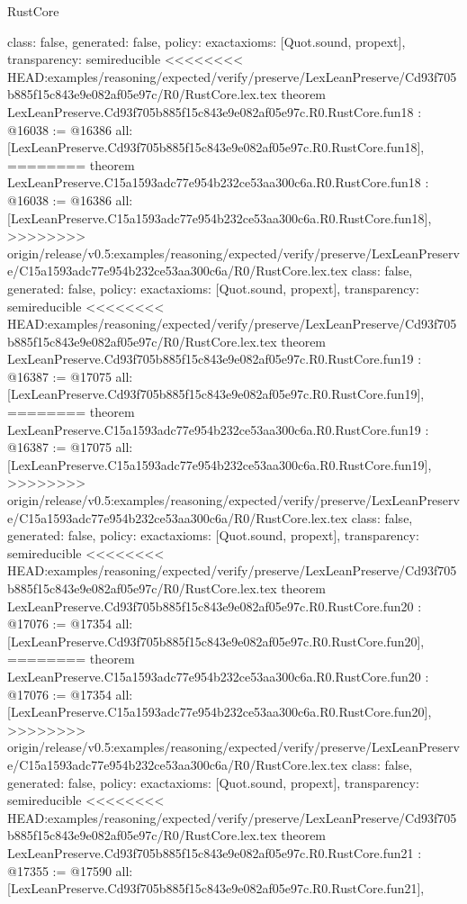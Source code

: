 \begin{lexlean}{RustCore}
\begin{coremodule}
{\begin{coremodule}
{{{{{{{{{{{{{{{{{{{{{  class: false,
  generated: false,
  policy: exact{axioms: [Quot.sound, propext]},
  transparency: semireducible
}
<<<<<<<< HEAD:examples/reasoning/expected/verify/preserve/LexLeanPreserve/Cd93f705b885f15c843e9e082af05e97c/R0/RustCore.lex.tex
theorem LexLeanPreserve.Cd93f705b885f15c843e9e082af05e97c.R0.RustCore.fun18 : @16038 := @16386 {
  all: [LexLeanPreserve.Cd93f705b885f15c843e9e082af05e97c.R0.RustCore.fun18],
========
theorem LexLeanPreserve.C15a1593adc77e954b232ce53aa300c6a.R0.RustCore.fun18 : @16038 := @16386 {
  all: [LexLeanPreserve.C15a1593adc77e954b232ce53aa300c6a.R0.RustCore.fun18],
>>>>>>>> origin/release/v0.5:examples/reasoning/expected/verify/preserve/LexLeanPreserve/C15a1593adc77e954b232ce53aa300c6a/R0/RustCore.lex.tex
  class: false,
  generated: false,
  policy: exact{axioms: [Quot.sound, propext]},
  transparency: semireducible
}
<<<<<<<< HEAD:examples/reasoning/expected/verify/preserve/LexLeanPreserve/Cd93f705b885f15c843e9e082af05e97c/R0/RustCore.lex.tex
theorem LexLeanPreserve.Cd93f705b885f15c843e9e082af05e97c.R0.RustCore.fun19 : @16387 := @17075 {
  all: [LexLeanPreserve.Cd93f705b885f15c843e9e082af05e97c.R0.RustCore.fun19],
========
theorem LexLeanPreserve.C15a1593adc77e954b232ce53aa300c6a.R0.RustCore.fun19 : @16387 := @17075 {
  all: [LexLeanPreserve.C15a1593adc77e954b232ce53aa300c6a.R0.RustCore.fun19],
>>>>>>>> origin/release/v0.5:examples/reasoning/expected/verify/preserve/LexLeanPreserve/C15a1593adc77e954b232ce53aa300c6a/R0/RustCore.lex.tex
  class: false,
  generated: false,
  policy: exact{axioms: [Quot.sound, propext]},
  transparency: semireducible
}
<<<<<<<< HEAD:examples/reasoning/expected/verify/preserve/LexLeanPreserve/Cd93f705b885f15c843e9e082af05e97c/R0/RustCore.lex.tex
theorem LexLeanPreserve.Cd93f705b885f15c843e9e082af05e97c.R0.RustCore.fun20 : @17076 := @17354 {
  all: [LexLeanPreserve.Cd93f705b885f15c843e9e082af05e97c.R0.RustCore.fun20],
========
theorem LexLeanPreserve.C15a1593adc77e954b232ce53aa300c6a.R0.RustCore.fun20 : @17076 := @17354 {
  all: [LexLeanPreserve.C15a1593adc77e954b232ce53aa300c6a.R0.RustCore.fun20],
>>>>>>>> origin/release/v0.5:examples/reasoning/expected/verify/preserve/LexLeanPreserve/C15a1593adc77e954b232ce53aa300c6a/R0/RustCore.lex.tex
  class: false,
  generated: false,
  policy: exact{axioms: [Quot.sound, propext]},
  transparency: semireducible
}
<<<<<<<< HEAD:examples/reasoning/expected/verify/preserve/LexLeanPreserve/Cd93f705b885f15c843e9e082af05e97c/R0/RustCore.lex.tex
theorem LexLeanPreserve.Cd93f705b885f15c843e9e082af05e97c.R0.RustCore.fun21 : @17355 := @17590 {
  all: [LexLeanPreserve.Cd93f705b885f15c843e9e082af05e97c.R0.RustCore.fun21],
}}}}}}}}}}}}}}}}}}}}}}}}
\end{coremodule}}
\end{coremodule}
\end{lexlean}

